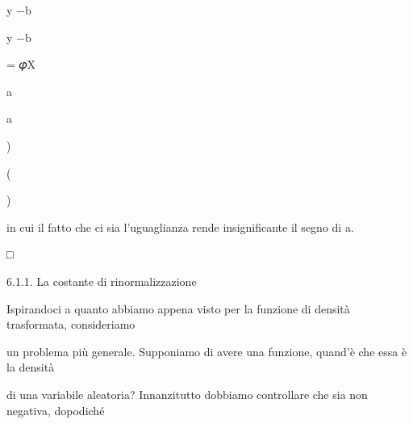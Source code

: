 \documentclass[a4paper,portrait,12pt]{article}
\begin{document}
\begin{flushleft}
y $-$b
\end{flushleft}


\begin{flushleft}
y $-$b
\end{flushleft}


\begin{flushleft}
= 𝜑X
\end{flushleft}


\begin{flushleft}
a
\end{flushleft}


\begin{flushleft}
a
\end{flushleft}





)





(





)





\begin{flushleft}
in cui il fatto che ci sia l'uguaglianza rende insignificante il segno di a.
\end{flushleft}





□





\begin{flushleft}
6.1.1. La costante di rinormalizzazione
\end{flushleft}


\begin{flushleft}
Ispirandoci a quanto abbiamo appena visto per la funzione di densit\`{a} trasformata, consideriamo
\end{flushleft}


\begin{flushleft}
un problema più generale. Supponiamo di avere una funzione, quand'\`{e} che essa \`{e} la densit\`{a}
\end{flushleft}


\begin{flushleft}
di una variabile aleatoria? Innanzitutto dobbiamo controllare che sia non negativa, dopodich\'{e}
\end{flushleft}
\end{document}
